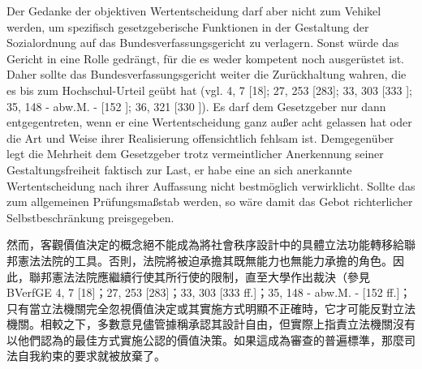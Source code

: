 \documentclass[12pt]{article}
\begin{document}
\syncleft
\begin{sourcepara}
Der Gedanke der objektiven Wertentscheidung darf aber nicht zum Vehikel werden, um spezifisch gesetzgeberische Funktionen in der Gestaltung der Sozialordnung auf das Bundesverfassungsgericht zu verlagern. Sonst würde das Gericht in eine Rolle gedrängt, für die es weder kompetent noch ausgerüstet ist. Daher sollte das Bundesverfassungsgericht weiter die Zurückhaltung wahren, die es bis zum Hochschul-Urteil geübt hat (vgl. \abbrBVerfGE{} 4, 7 [18]; 27, 253 [283]; 33, 303 [333 \abbrF{}]; 35, 148 - abw.M. - [152 \abbrFF{}]; 36, 321 [330 \abbrFF{}]). Es darf dem Gesetzgeber nur dann entgegentreten, wenn er eine Wertentscheidung ganz außer acht gelassen hat oder die Art und Weise ihrer Realisierung offensichtlich fehlsam ist. Demgegenüber legt die Mehrheit dem Gesetzgeber trotz vermeintlicher Anerkennung seiner Gestaltungsfreiheit faktisch zur Last, er habe eine an sich anerkannte Wertentscheidung nach ihrer Auffassung nicht bestmöglich verwirklicht. Sollte das zum allgemeinen Prüfungsmaßstab werden, so wäre damit das Gebot richterlicher Selbstbeschränkung preisgegeben.
\end{sourcepara}
\begin{transpara}
然而，客觀價值決定的概念絕不能成為將社會秩序設計中的具體立法功能轉移給聯邦憲法法院的工具。否則，法院將被迫承擔其既無能力也無能力承擔的角色。因此，聯邦憲法法院應繼續行使其所行使的限制，直至大學作出裁決（參見 BVerfGE 4, 7 [18]；27, 253 [283]；33, 303 [333 ff.]；35, 148 - abw.M. - [152 ff.]；只有當立法機關完全忽視價值決定或其實施方式明顯不正確時，它才可能反對立法機關。相較之下，多數意見儘管據稱承認其設計自由，但實際上指責立法機關沒有以他們認為的最佳方式實施公認的價值決策。如果這成為審查的普遍標準，那麼司法自我約束的要求就被放棄了。
\end{transpara}
\end{document}
